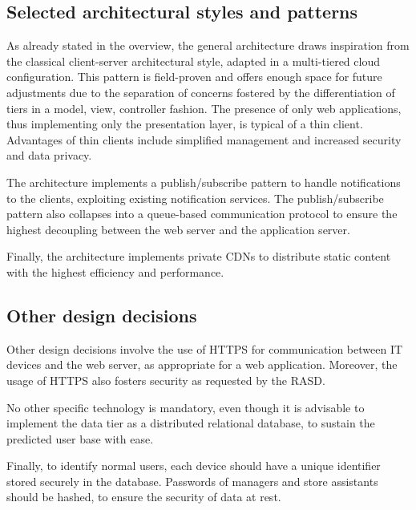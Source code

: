 \documentclass[../../main.tex]{subfiles}
\begin{document}
\subsection{Selected architectural styles and patterns}

    As already stated in the overview, the general architecture draws inspiration from the classical client-server architectural style, adapted in a multi-tiered cloud configuration.  
    This pattern is field-proven and offers enough space for future adjustments due to the separation of concerns fostered by the differentiation of tiers in a model, view, controller fashion.
    The presence of only web applications, thus implementing only the presentation layer, is typical of a thin client. Advantages of thin clients include simplified management and 
    increased security and data privacy.

    The architecture implements a publish/subscribe pattern to handle notifications to the clients, exploiting existing notification services. 
    The publish/subscribe pattern also collapses into a queue-based communication protocol to ensure the highest decoupling between the web server and the application server.

    Finally, the architecture implements private CDNs to distribute static content with the highest efficiency and performance.


\subsection{Other design decisions}

    Other design decisions involve the use of HTTPS for communication between IT devices and the web server, as appropriate for a web application. Moreover, 
    the usage of HTTPS also fosters security as requested by the RASD.

    No other specific technology is mandatory, even though it is advisable to implement the data tier as a distributed relational database, to sustain the predicted user base with ease.

    Finally, to identify normal users, each device should have a unique identifier stored securely in the database. 
    Passwords of managers and store assistants should be hashed, to ensure the security of data at rest.
\end{document}
